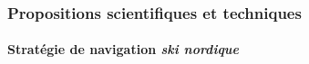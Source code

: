 \documentclass{beamer}
\begin{document}
			\begin{frame}
				\frametitle{Propositions scientifiques et techniques}
				\framesubtitle{Stratégie de navigation \textit{ski nordique}}
				\begin{figure}[H]
					\centering
				\end{figure}
			\end{frame}
\end{document}
